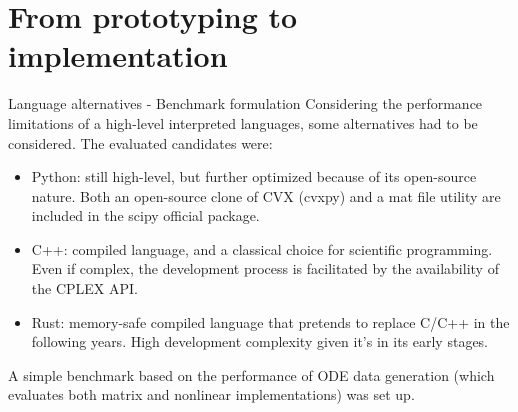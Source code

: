 \documentclass{beamer}
\begin{document}
\section{From prototyping to implementation}

\begin{frame}{Language alternatives - Benchmark formulation}
    Considering the performance limitations of a high-level interpreted languages, some alternatives had to be considered. The evaluated candidates were:

    \begin{itemize}
        \item Python: still high-level, but further optimized because of its open-source nature. Both an open-source clone of CVX (cvxpy) and a mat file utility are included in the scipy official package.
        \item C++: compiled language, and a classical choice for scientific programming. Even if complex, the development process is facilitated by the availability of the CPLEX API.
        \item Rust: memory-safe compiled language that pretends to replace C/C++ in the following years. High development complexity given it's in its early stages.
    \end{itemize}

    A simple benchmark based on the performance of ODE data generation (which evaluates both matrix and nonlinear implementations) was set up.
\end{frame}
\end{document}
